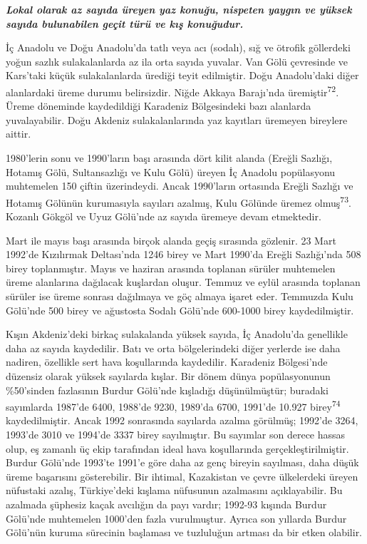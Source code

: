 \documentclass[
  letterpaper,
  DIV=11,
  numbers=noendperiod]{scrreprt}
\begin{document}
\textbf{\emph{Lokal olarak az sayıda üreyen yaz konuğu, nispeten yaygın
ve yüksek sayıda bulunabilen geçit türü ve kış konuğudur.}}

İç Anadolu ve Doğu Anadolu'da tatlı veya acı (sodalı), sığ ve ötrofik
göllerdeki yoğun sazlık sulakalanlarda az ila orta sayıda yuvalar. Van
Gölü çevresinde ve Kars'taki küçük sulakalanlarda ürediği teyit
edilmiştir. Doğu Anadolu'daki diğer alanlardaki üreme durumu
belirsizdir. Niğde Akkaya Barajı'nda üremiştir\textsuperscript{72}.
Üreme döneminde kaydedildiği Karadeniz Bölgesindeki bazı alanlarda
yuvalayabilir. Doğu Akdeniz sulakalanlarında yaz kayıtları üremeyen
bireylere aittir.

1980'lerin sonu ve 1990'ların başı arasında dört kilit alanda (Ereğli
Sazlığı, Hotamış Gölü, Sultansazlığı ve Kulu Gölü) üreyen İç Anadolu
popülasyonu muhtemelen 150 çiftin üzerindeydi. Ancak 1990'ların
ortasında Ereğli Sazlığı ve Hotamış Gölünün kurumasıyla sayıları
azalmış, Kulu Gölünde üremez olmuş\textsuperscript{73}. Kozanlı Gökgöl
ve Uyuz Gölü'nde az sayıda üremeye devam etmektedir.

Mart ile mayıs başı arasında birçok alanda geçiş sırasında gözlenir. 23
Mart 1992'de Kızılırmak Deltası'nda 1246 birey ve Mart 1990'da Ereğli
Sazlığı'nda 508 birey toplanmıştır. Mayıs ve haziran arasında toplanan
sürüler muhtemelen üreme alanlarına dağılacak kuşlardan oluşur. Temmuz
ve eylül arasında toplanan sürüler ise üreme sonrası dağılmaya ve göç
almaya işaret eder. Temmuzda Kulu Gölü'nde 500 birey ve ağustosta Sodalı
Gölü'nde 600-1000 birey kaydedilmiştir.

Kışın Akdeniz'deki birkaç sulakalanda yüksek sayıda, İç Anadolu'da
genellikle daha az sayıda kaydedilir. Batı ve orta bölgelerindeki diğer
yerlerde ise daha nadiren, özellikle sert hava koşullarında kaydedilir.
Karadeniz Bölgesi'nde düzensiz olarak yüksek sayılarda kışlar. Bir dönem
dünya popülasyonunun \%50'sinden fazlasının Burdur Gölü'nde kışladığı
düşünülmüştür; buradaki sayımlarda 1987'de 6400, 1988'de 9230, 1989'da
6700, 1991'de 10.927 birey\textsuperscript{74} kaydedilmiştir. Ancak
1992 sonrasında sayılarda azalma görülmüş; 1992'de 3264, 1993'de 3010 ve
1994'de 3337 birey sayılmıştır. Bu sayımlar son derece hassas olup, eş
zamanlı üç ekip tarafından ideal hava koşullarında gerçekleştirilmiştir.
Burdur Gölü'nde 1993'te 1991'e göre daha az genç bireyin sayılması, daha
düşük üreme başarısını gösterebilir. Bir ihtimal, Kazakistan ve çevre
ülkelerdeki üreyen nüfustaki azalış, Türkiye'deki kışlama nüfusunun
azalmasını açıklayabilir. Bu azalmada şüphesiz kaçak avcılığın da payı
vardır; 1992-93 kışında Burdur Gölü'nde muhtemelen 1000'den fazla
vurulmuştur. Ayrıca son yıllarda Burdur Gölü'nün kuruma sürecinin
başlaması ve tuzluluğun artması da bir etken olabilir.
\end{document}
